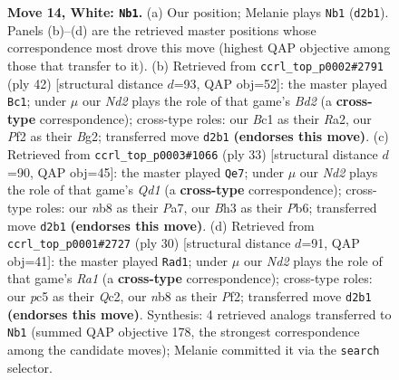 \documentclass[11pt]{article}
\begin{document}
\begin{figure}[p]
\caption{\textbf{Move 14, White: \texttt{Nb1}.} (a) Our position; Melanie plays \texttt{Nb1} (\texttt{d2b1}). Panels (b)--(d) are the retrieved master positions whose correspondence most drove this move (highest QAP objective among those that transfer to it). (b) Retrieved from \texttt{ccrl\_top\_p0002\#2791} (ply 42) [structural distance $d$=93, QAP obj=52]: the master played \texttt{Bc1}; under $\mu$ our \emph{Nd2} plays the role of that game's \emph{Bd2} (a \textbf{cross-type} correspondence); cross-type roles: our \emph{B}c1 as their \emph{R}a2, our \emph{P}f2 as their \emph{B}g2; transferred move \texttt{d2b1} \textbf{(endorses this move)}. (c) Retrieved from \texttt{ccrl\_top\_p0003\#1066} (ply 33) [structural distance $d$=90, QAP obj=45]: the master played \texttt{Qe7}; under $\mu$ our \emph{Nd2} plays the role of that game's \emph{Qd1} (a \textbf{cross-type} correspondence); cross-type roles: our \emph{n}b8 as their \emph{P}a7, our \emph{B}h3 as their \emph{P}b6; transferred move \texttt{d2b1} \textbf{(endorses this move)}. (d) Retrieved from \texttt{ccrl\_top\_p0001\#2727} (ply 30) [structural distance $d$=91, QAP obj=41]: the master played \texttt{Rad1}; under $\mu$ our \emph{Nd2} plays the role of that game's \emph{Ra1} (a \textbf{cross-type} correspondence); cross-type roles: our \emph{p}c5 as their \emph{Q}c2, our \emph{n}b8 as their \emph{P}f2; transferred move \texttt{d2b1} \textbf{(endorses this move)}. Synthesis: 4 retrieved analogs transferred to \texttt{Nb1} (summed QAP objective 178, the strongest correspondence among the candidate moves); Melanie committed it via the \texttt{search} selector.}
\label{fig:thought-m26}
\end{figure}

\clearpage
\end{document}
